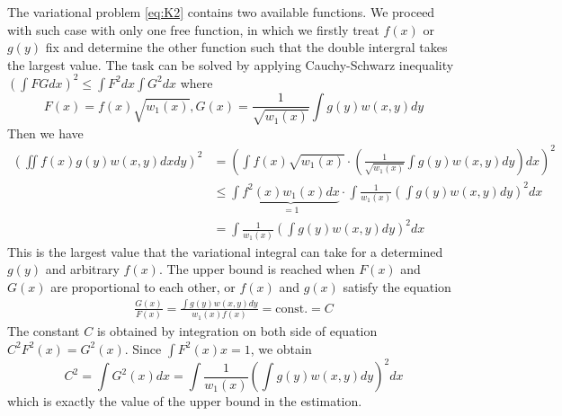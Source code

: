 \documentclass{article}
\begin{document}
The variational problem \eqref{eq:K2} 
contains two available functions.
We proceed with such case with only one free function,
in which we firstly treat $f(x)$ or $g(y)$ fix and determine
the other function such that the double intergral takes the largest
value. The task can be solved by applying Cauchy-Schwarz
inequality $(\int FGdx)^2 \leq \int F^2dx \int G^2dx$ where
$$
F(x)=f(x)\sqrt{w_1(x)},
G(x)=\frac{1}{\sqrt{w_1(x)}}\int g(y) w(x,y)dy
$$
Then we have
\begin{align*}
    (\iint f(x)g(y) w(x,y) dxdy)^2
    &= \left(\int f(x)\sqrt{w_1(x)} \cdot (\frac{1}{\sqrt{w_1(x)}}
    \int g(y)w(x,y)dy) dx\right)^2 \\
    &\leq \int \underbrace{f^2(x) w_1(x) dx}_{=1} \cdot
    \int \frac{1}{w_1(x)} (\int g(y) w(x,y)dy)^2 dx \\
    &= \int \frac{1}{w_1(x)} (\int g(y) w(x,y)dy)^2 dx
\end{align*}
This is the largest value that the variational
integral can take for a determined $g(y)$ and arbitrary
$f(x)$. The upper bound is reached when $F(x)$ and $G(x)$ are proportional to each other, or $f(x)$ and $g(x)$ satisfy
the equation
\begin{align*}
    \frac{G(x)}{F(x)}
    = \frac{\int g(y) w(x,y)dy}{w_1(x)f(x)}
    = \textrm{const.} = C
\end{align*}
The constant $C$ is obtained
by integration on both side of equation $C^2F^2(x) = G^2(x)$.
Since $\int F^2(x) x = 1$, we obtain
$$
C^2 = \int G^2(x)dx
= \int \frac{1}{w_1(x)} (\int g(y) w(x,y)dy)^2 dx
$$
which is exactly the value of the upper bound in the
estimation.
\end{document}
